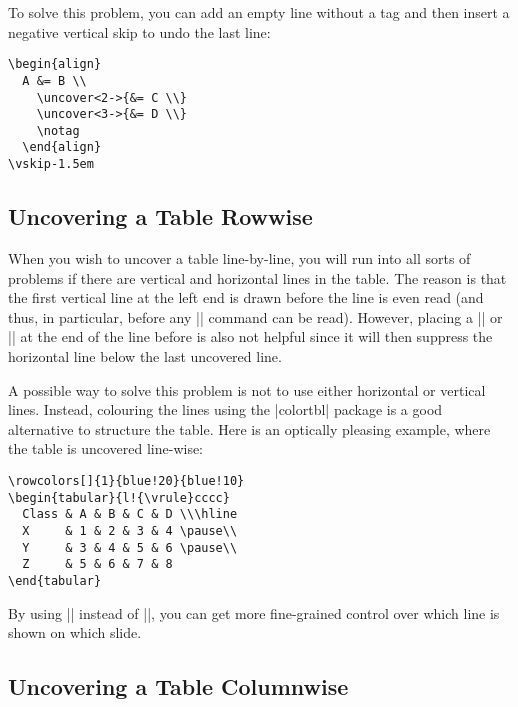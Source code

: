 To solve this problem, you can add an empty line without a tag and then
insert a negative vertical skip to undo the last line:
\begin{verbatim}
\begin{align}
  A &= B \\
    \uncover<2->{&= C \\}
    \uncover<3->{&= D \\}
    \notag
  \end{align}
\vskip-1.5em
\end{verbatim}


\subsection{Uncovering a Table Rowwise}

When you wish to uncover a table line-by-line, you will run into all
sorts of problems if there are vertical and horizontal lines in the
table. The reason is that the first vertical line at the left end is
drawn before the line is even read (and thus, in particular, before
any |\onslide| command can be read). However, placing a |\pause| or
|\uncover| at the end of the line before is also not helpful since it
will then suppress the horizontal line below the last uncovered line.

A possible way to solve this problem is not to use either horizontal
or vertical lines. Instead, colouring the lines using the |colortbl|
package is a good alternative to structure the table. Here is an
optically pleasing example, where the table is uncovered line-wise:

\begin{verbatim}
\rowcolors[]{1}{blue!20}{blue!10}
\begin{tabular}{l!{\vrule}cccc}
  Class & A & B & C & D \\\hline
  X     & 1 & 2 & 3 & 4 \pause\\
  Y     & 3 & 4 & 5 & 6 \pause\\
  Z     & 5 & 6 & 7 & 8
\end{tabular}
\end{verbatim}

By using |\onslide| instead of |\pause|, you can get more fine-grained
control over which line is shown on which slide.


\subsection{Uncovering a Table Columnwise}

